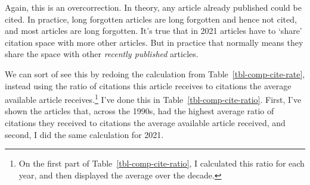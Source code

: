 \documentclass[
  12pt,
  letterpaper,
  DIV=11,
  numbers=noendperiod]{scrartcl}
\begin{document}
Again, this is an overcorrection. In theory, any article already
published could be cited. In practice, long forgotten articles are long
forgotten and hence not cited, and most articles are long forgotten.
It's true that in 2021 articles have to `share' citation space with more
other articles. But in practice that normally means they share the space
with other \emph{recently published} articles.

We can sort of see this by redoing the calculation from
Table~\ref{tbl-comp-cite-rate}, instead using the ratio of citations
this article receives to citations the average available article
receives.\footnote{On the first part of Table~\ref{tbl-comp-cite-ratio},
  I calculated this ratio for each year, and then displayed the average
  over the decade.} I've done this in Table~\ref{tbl-comp-cite-ratio}.
First, I've shown the articles that, across the 1990s, had the highest
average ratio of citations they received to citations the average
available article received, and second, I did the same calculation for
2021.
\end{document}

